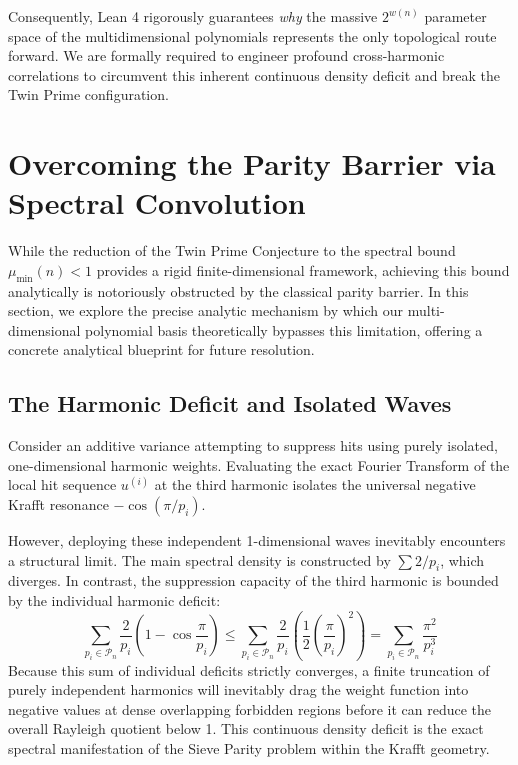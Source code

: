 \documentclass[lean]{AFM}
\renewcommand{\.}{\hskip .75pt}
\begin{document}
Consequently, Lean 4 rigorously guarantees \textit{why} the massive $2^{w(n)}$ parameter space of
the multidimensional polynomials represents the only topological route forward. We are formally
required to engineer profound cross-harmonic correlations to circumvent this inherent continuous
density deficit and break the Twin Prime configuration.


\section{Overcoming the Parity Barrier via Spectral Convolution} \label{crossharmonics}

While the reduction of the Twin Prime Conjecture to the spectral bound $\mu_{\min}(n) < 1$ provides
a rigid finite-dimensional framework, achieving this bound analytically is notoriously obstructed
by the classical parity barrier. In this section, we explore the precise analytic mechanism by
which our multi-dimensional polynomial basis theoretically bypasses this limitation, offering a
concrete analytical blueprint for future resolution.

\subsection{The Harmonic Deficit and Isolated Waves}

Consider an additive variance attempting to suppress hits using purely isolated, one-dimensional
harmonic weights. Evaluating the exact Fourier Transform of the local hit sequence $u^{(i)}$ at
the third harmonic isolates the universal negative Krafft resonance $-\cos(\pi/p_i)$. 

However, deploying these independent 1-dimensional waves inevitably encounters a structural limit.
The main spectral density is constructed by $\sum 2/p_i$, which diverges. In contrast, the
suppression capacity of the third harmonic is bounded by the individual harmonic deficit:
$$ \sum_{p_i \in \mathcal{P}_n} \frac{2}{p_i}\left(1 - \cos\frac{\pi}{p_i}\right)
\le \sum_{p_i \in \mathcal{P}_n} \frac{2}{p_i} \left(\frac{1}{2}\left(\frac{\pi}{p_i}\right)^2\right)
 = \sum_{p_i \in \mathcal{P}_n} \frac{\pi^2}{p_i^3} $$
Because this sum of individual deficits strictly converges, a finite truncation of purely
independent harmonics will inevitably drag the weight function into negative values at dense
overlapping forbidden regions before it can reduce the overall Rayleigh quotient below 1. This
continuous density deficit is the exact spectral manifestation of the Sieve Parity problem within
the Krafft geometry.
\end{document}
